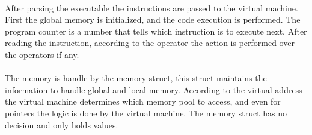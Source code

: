 \paragraph{} After parsing the executable the instructions are passed to the
virtual machine. First the global memory is initialized, and the code execution
is performed. The program counter is a number that tells which instruction is
to execute next. After reading the instruction, according to the operator the
action is performed over the operators if any.

\paragraph{} The memory is handle by the memory struct, this struct maintains
the information to handle global and local memory. According to the virtual
address the virtual machine determines which memory pool to access, and even
for pointers the logic is done by the virtual machine. The memory struct has no
decision and only holds values.
